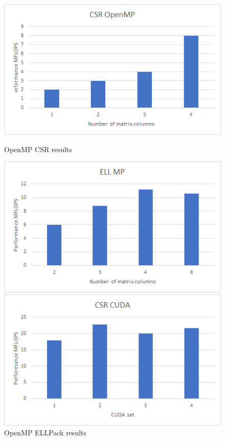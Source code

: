 \documentclass{scrreprt}
\begin{document}
\begin{figure}[ht] 
  \label{ fig7} 
  \begin{minipage}[b]{0.5\linewidth}
    \centering
    \includegraphics[width=.9\linewidth]{mhda416CSRMP.png} 
    \caption{OpenMP CSR results} 
    \vspace{4ex}
  \end{minipage}%
  \begin{minipage}[b]{0.5\linewidth}
    \centering
    \includegraphics[width=.9\linewidth]{mhda416ELLMP.png} 
    \caption{OpenMP ELLPack results} 
    \vspace{4ex}
  \end{minipage} 
  \begin{minipage}[b]{0.5\linewidth}
    \centering
    \includegraphics[width=.9\linewidth]{mhda416CSRCUDA.png} 

\end{minipage}
\end{figure}
\end{document}
